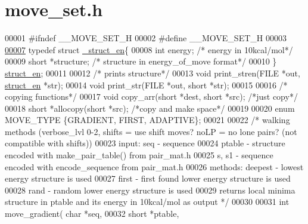 \hypertarget{move__set_8h_source}{}\section{move\+\_\+set.\+h}
\label{move__set_8h_source}

\begin{DoxyCode}
00001 \textcolor{preprocessor}{#ifndef \_\_MOVE\_SET\_H}
00002 \textcolor{preprocessor}{#define \_\_MOVE\_SET\_H}
00003 
\hypertarget{move__set_8h_source.tex_l00007}{}\hyperlink{struct__struct__en}{00007} \textcolor{keyword}{typedef} \textcolor{keyword}{struct }\hyperlink{struct__struct__en}{\_struct\_en}\{
00008   \textcolor{keywordtype}{int} energy;        \textcolor{comment}{/* energy in 10kcal/mol*/}
00009   \textcolor{keywordtype}{short} *structure;  \textcolor{comment}{/* structure in energy\_of\_move format*/}
00010 \} \hyperlink{struct__struct__en}{struct\_en};
00011 
00012 \textcolor{comment}{/* prints structure*/}
00013 \textcolor{keywordtype}{void} print\_stren(FILE *out, \hyperlink{struct__struct__en}{struct\_en} *str);
00014 \textcolor{keywordtype}{void} print\_str(FILE *out, \textcolor{keywordtype}{short} *str);
00015 
00016 \textcolor{comment}{/* copying functions*/}
00017 \textcolor{keywordtype}{void} copy\_arr(\textcolor{keywordtype}{short} *dest, \textcolor{keywordtype}{short} *src); \textcolor{comment}{/*just copy*/}
00018 \textcolor{keywordtype}{short} *allocopy(\textcolor{keywordtype}{short} *src);            \textcolor{comment}{/*copy and make space*/}
00019 
00020 \textcolor{keyword}{enum} MOVE\_TYPE \{GRADIENT, FIRST, ADAPTIVE\};
00021 
00022 \textcolor{comment}{/* walking methods (verbose\_lvl 0-2, shifts = use shift moves? noLP = no lone pairs? (not compatible with
       shifts))}
00023 \textcolor{comment}{    input:    seq - sequence}
00024 \textcolor{comment}{              ptable - structure encoded with make\_pair\_table() from pair\_mat.h}
00025 \textcolor{comment}{              s, s1 - sequence encoded with encode\_sequence from pair\_mat.h}
00026 \textcolor{comment}{    methods:  deepest - lowest energy structure is used}
00027 \textcolor{comment}{              first - first found lower energy structure is used}
00028 \textcolor{comment}{              rand - random lower energy structure is used}
00029 \textcolor{comment}{    returns local minima structure in ptable and its energy in 10kcal/mol as output */}
00030 
00031 \textcolor{keywordtype}{int} move\_gradient( \textcolor{keywordtype}{char} *seq,
00032                   \textcolor{keywordtype}{short} *ptable,

\end{DoxyCode}
